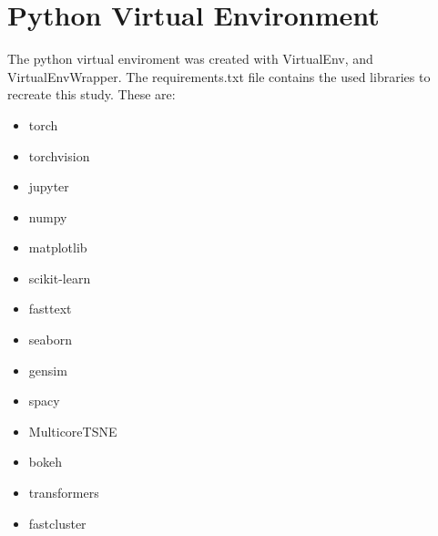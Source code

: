 \section{Python Virtual Environment}\label{sec:Python Virtual Environment}
The python virtual enviroment was created with VirtualEnv, and VirtualEnvWrapper. The requirements.txt file contains the used libraries to recreate this study. These are:

\begin{itemize}
  \item torch
  \item torchvision
  \item jupyter
  \item numpy
  \item matplotlib
  \item scikit-learn
  \item fasttext
  \item seaborn
  \item gensim
  \item spacy
  \item MulticoreTSNE
  \item bokeh
  \item transformers
  \item fastcluster
\end{itemize}
